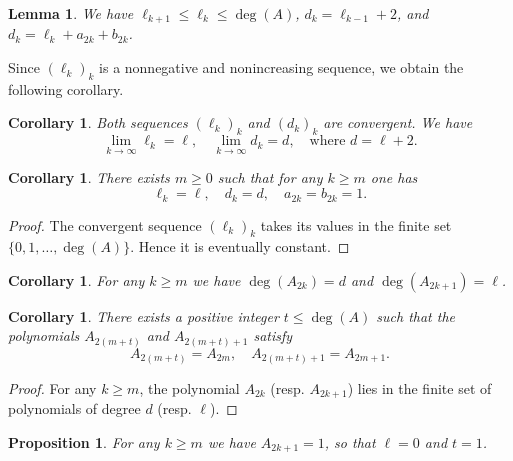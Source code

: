 \documentclass [12pt]{article}
\newtheorem{proposition}[theorem]{Proposition}
\newtheorem{corollary}[theorem]{Corollary}
\newtheorem{lemma}[theorem]{Lemma}
\begin{document}
\begin{lemma} \label{lesdkellk}
We have $\ell_{k+1} \leq \ell_k \leq \deg(A)$, $d_k = \ell_{k-1} + 2$, and $d_k = \ell_k + a_{2k} + b_{2k}$.
\end{lemma}

Since $(\ell_k)_k$ is a nonnegative and nonincreasing sequence, we obtain the following corollary.

\begin{corollary} \label{ellCV}
Both sequences $(\ell_k)_k$ and $(d_k)_k$ are convergent. We have
\[
\lim_{k \to \infty} \ell_k = \ell, \quad \lim_{k \to \infty} d_k = d, \quad \text{where } d = \ell + 2.
\]
\end{corollary}

\begin{corollary} \label{stationnaire}
There exists $m \geq 0$ such that for any $k \geq m$ one has
\[
\ell_k = \ell, \quad d_k = d, \quad a_{2k} = b_{2k} = 1.
\]
\end{corollary}

\begin{proof}
The convergent sequence $(\ell_k)_k$ takes its values in the finite set $\{0,1,\ldots, \deg(A)\}$. Hence it is eventually constant.
\end{proof}

\begin{corollary} \label{samedegrees}
For any $k \geq m$ we have $\deg(A_{2k}) = d$ and $\deg(A_{2k+1}) = \ell$.
\end{corollary}

\begin{corollary} \label{cyclic}
There exists a positive integer $t \leq \deg(A)$ such that the polynomials $A_{2(m+t)}$ and $A_{2(m+t)+1}$ satisfy
\[
A_{2(m+t)} = A_{2m}, \quad A_{2(m+t)+1} = A_{2m+1}.
\]
\end{corollary}

\begin{proof}
For any $k \geq m$, the polynomial $A_{2k}$ (resp. $A_{2k+1}$) lies in the finite set of polynomials of degree $d$ (resp. $\ell$).
\end{proof}

\begin{proposition} \label{lesAjodd=1}
For any $k \geq m$ we have $A_{2k+1} = 1$, so that $\ell = 0$ and $t = 1$.
\end{proposition}
\end{document}
